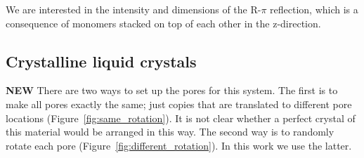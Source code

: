 \documentclass{article}
\begin{document}
  We are interested in the intensity and dimensions of the R-$\pi$ reflection,
  which is a consequence of monomers stacked on top of each other in the
  z-direction.

  \subsection{Crystalline liquid crystals}

  \textbf{NEW} There are two ways to set up the pores for this system. The
  first is to make all pores exactly the same; just copies that are translated to
  different pore locations (Figure~\ref{fig:same_rotation}). It is not clear
  whether a perfect crystal of this material would be arranged in this way. The
  second way is to randomly rotate each pore
  (Figure~\ref{fig:different_rotation}). In this work we use the latter.  
  
\end{document}
